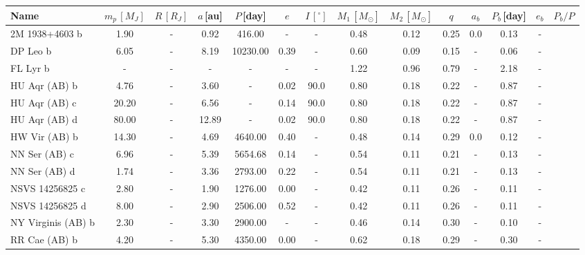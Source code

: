 \documentclass[twoside,openright,titlepage,numbers=noenddot,headinclude,%
                footinclude=true,cleardoublepage=empty,abstractoff, 
                BCOR=5mm,paper=a4,fontsize=11pt,%
                american,%
                ]{scrreprt}%
\begin{document}
\begin{table}
\centering
\begin{tabular}{lccccccccccccc}
\toprule
    Name & $m_p\,[M_J]$ & $R\,[R_J]$ & $a\,$[au] &$P\,$[day] & $e$ & $I\,[^{\circ}]$ &  $M_1\,[M_\odot]$ &$M_2\,[M_\odot]$ &$q$ &  $a_b$ &   $P_b\,$[day] &  $e_b$ &  $P_b/P$\\
\midrule
2M 1938+4603 b     &   1.90 & - &   0.92 &    416.00 &   - &   - &    0.48 &    0.12 &  0.25 &       0.0 &      0.13 &       - \\
    DP Leo b           &   6.05 & - &   8.19 &  10230.00 &  0.39 &   - &    0.60 &    0.09 &  0.15 &       - &      0.06 &       - \\
    FL Lyr b           &    - & - &    - &       - &   - &   - &    1.22 &    0.96 &  0.79 &       - &      2.18 &       - \\
    HU Aqr (AB) b      &   4.76 & - &   3.60 &       - &  0.02 &  90.0 &    0.80 &    0.18 &  0.22 &       - &      0.87 &       - \\
    HU Aqr (AB) c      &  20.20 & - &   6.56 &       - &  0.14 &  90.0 &    0.80 &    0.18 &  0.22 &       - &      0.87 &       - \\
    HU Aqr (AB) d      &  80.00 & - &  12.89 &       - &  0.02 &  90.0 &    0.80 &    0.18 &  0.22 &       - &      0.87 &       - \\
    HW Vir (AB) b      &  14.30 & - &   4.69 &   4640.00 &  0.40 &   - &    0.48 &    0.14 &  0.29 &       0.0 &      0.12 &       - \\
    NN Ser (AB) c      &   6.96 & - &   5.39 &   5654.68 &  0.14 &   - &    0.54 &    0.11 &  0.21 &       - &      0.13 &       - \\
    NN Ser (AB) d      &   1.74 & - &   3.36 &   2793.00 &  0.22 &   - &    0.54 &    0.11 &  0.21 &       - &      0.13 &       - \\
    NSVS 14256825 c    &   2.80 & - &   1.90 &   1276.00 &  0.00 &   - &    0.42 &    0.11 &  0.26 &       - &      0.11 &       - \\
    NSVS 14256825 d    &   8.00 & - &   2.90 &   2506.00 &  0.52 &   - &    0.42 &    0.11 &  0.26 &       - &      0.11 &       - \\
    NY Virginis (AB) b &   2.30 & - &   3.30 &   2900.00 &   - &   - &    0.46 &    0.14 &  0.30 &       - &      0.10 &       - \\
    RR Cae (AB) b      &   4.20 & - &   5.30 &   4350.00 &  0.00 &   - &    0.62 &    0.18 &  0.29 &       - &      0.30 &       - \\

\end{tabular}
\end{table}
\end{document}
